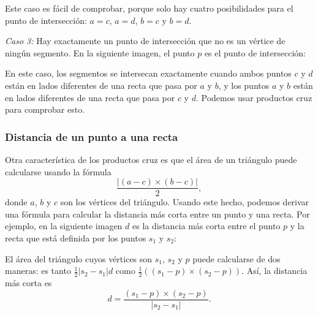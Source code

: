 Este caso es fácil de comprobar, porque
solo hay cuatro posibilidades
para el punto de intersección:
$a=c$, $a=d$, $b=c$ y $b=d$.

\textit{Caso 3:}
Hay exactamente un punto de intersección
que no es un vértice de ningún segmento.
En la siguiente imagen, el punto $p$
es el punto de intersección:
\begin{center}
\end{center}

En este caso, los segmentos se intersecan
exactamente cuando ambos puntos $c$ y $d$ están
en lados diferentes de una recta que pasa por $a$ y $b$,
y los puntos $a$ y $b$ están en lados diferentes
de una recta que pasa por $c$ y $d$.
Podemos usar productos cruz para comprobar esto.

\subsubsection{Distancia de un punto a una recta}

Otra característica de los productos cruz es que
el área de un triángulo puede calcularse
usando la fórmula
\[\frac{| (a-c) \times (b-c) |}{2},\]
donde $a$, $b$ y $c$ son los vértices del triángulo.
Usando este hecho, podemos derivar una fórmula
para calcular la distancia más corta entre un punto y una recta.
Por ejemplo, en la siguiente imagen $d$ es la
distancia más corta entre el punto $p$ y la recta
que está definida por los puntos $s_1$ y $s_2$:
\begin{center}
\end{center}

El área del triángulo cuyos vértices son
$s_1$, $s_2$ y $p$ puede calcularse de dos maneras:
es tanto
$\frac{1}{2} |s_2-s_1| d$ como
$\frac{1}{2} ((s_1-p) \times (s_2-p))$.
Así, la distancia más corta es
\[ d = \frac{(s_1-p) \times (s_2-p)}{|s_2-s_1|} .\]

